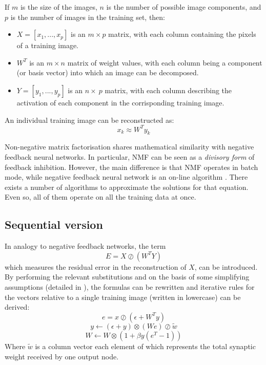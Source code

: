 \documentclass[11pt,a4paper]{report}
\begin{document}
			If $m$ is the size of the images, $n$ is the number of possible image components, and $p$ is the number of images in the training set, then:
			\begin{itemize}
				\item $X = [x_1, ..., x_p]$ is an $m \times p$ matrix, with each column containing the pixels of a training image.
				\item $W^T$ is an $m \times n$ matrix of weight values, with each column being a component (or basis vector) into which an image can be decomposed.
				\item $Y = [y_1, ..., y_p]$ is an $n \times\ p$ matrix, with each column describing the activation of each component in the corrisponding training image.
			\end{itemize}
			An individual training image can be reconstructed as:
			\begin{equation}
				x_k \approx W^T y_k
			\end{equation}

			Non-negative matrix factorisation shares mathematical similarity with negative feedback neural networks. In particular, NMF can be seen as a \emph{divisory form} of feedback inhibition. However, the main difference is that NMF operates in batch mode, while negative feedback neural network is an on-line algorithm \cite{spratling2009unsupervised}. There exists a number of algorithms to approximate the solutions for that equation. Even so, all of them operate on all the training data at once.
			
			\subsection{Sequential version}
			In analogy to negative feedback networks, the term
			\begin{equation*}
				E = X \oslash (W^T Y)
			\end{equation*}
			which measures the residual error in the reconstruction of $X$, can be introduced. By performing the relevant substitutions and on the basis of some simplifying assumptions (detailed in \cite{spratling2009unsupervised}), the formulas can be rewritten and iterative rules for the vectors relative to a single training image (written in lowercase) can be derived:
			\begin{equation}
				\label{eq:nmf_error}
				e = x \oslash (\epsilon + W^T y)
			\end{equation}
			\begin{equation}
				y \leftarrow (\epsilon + y) \otimes (We) \oslash \tilde{w}
			\end{equation}
			\begin{equation}
				W \leftarrow W \otimes (1 + \beta y (e^T - 1))
			\end{equation}
			Where $\tilde{w}$ is a column vector each element of which represents the total synaptic weight received by one output node.
			
\end{document}
